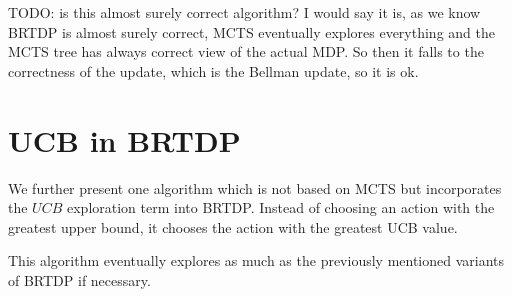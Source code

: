 TODO:
is this almost surely correct algorithm?
I would say it is, as we know BRTDP is almost surely correct, MCTS eventually explores everything and the MCTS tree has always correct view of the actual MDP. So then it falls to the correctness of the update, which is the Bellman update, so it is ok.

\section{UCB in BRTDP}

We further present one algorithm which is not based on MCTS but
incorporates the $UCB$ exploration term into BRTDP. Instead of choosing
an action with the greatest upper bound, it chooses the action with the
greatest UCB value.

This algorithm eventually explores as much as the previously mentioned
variants of BRTDP if necessary.
